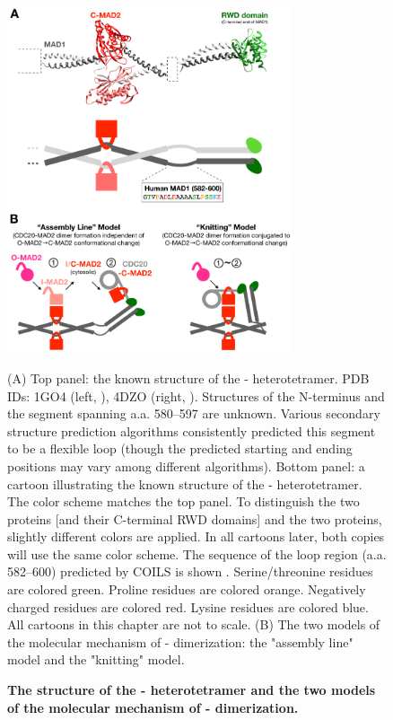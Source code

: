 \begin{figure}
    \centering
    \includegraphics[width=0.75\textwidth]{chapters/figures/MAD1C+KnittingModel.pdf}
    \caption{\textbf{The structure of the - heterotetramer and the two models of the molecular mechanism of - dimerization.}}
    \noindent\justifying (A) Top panel: the known structure of the - heterotetramer. PDB IDs: 1GO4 (left, \cite{Structure1GO4}), 4DZO (right, \cite{Structure4DZO}). Structures of the N-terminus and the segment spanning a.a. 580--597 are unknown. Various secondary structure prediction algorithms consistently predicted this segment to be a flexible loop (though the predicted starting and ending positions may vary among different algorithms). Bottom panel: a cartoon illustrating the known structure of the - heterotetramer. The color scheme matches the top panel. To distinguish the two  proteins [and their C-terminal RWD domains] and the two  proteins, slightly different colors are applied. In all cartoons later, both copies will use the same color scheme. The sequence of the loop region (a.a. 582--600) predicted by COILS is shown \cite{LupasCOILS}. Serine/threonine residues are colored green. Proline residues are colored orange. Negatively charged residues are colored red. Lysine residues are colored blue. All cartoons in this chapter are not to scale. (B) The two models of the molecular mechanism of - dimerization: the "assembly line" model and the "knitting" model.
    \label{MAD1C+KnittingModel}
\end{figure}

